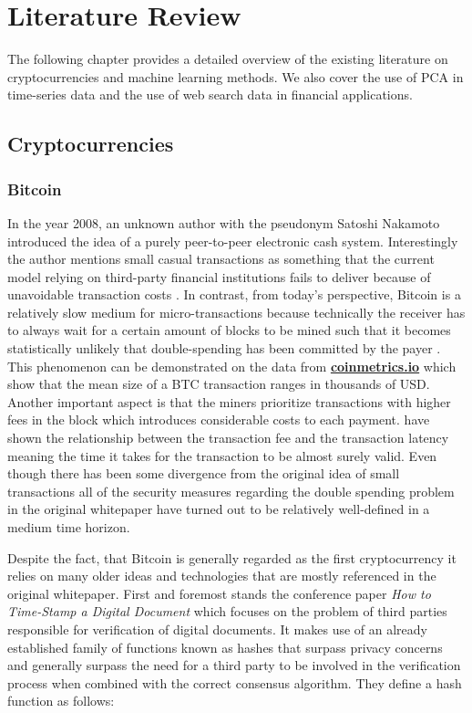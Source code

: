 \chapter{Literature Review}
\label{chap:two}

The following chapter
provides a detailed overview of the existing literature
on cryptocurrencies and machine learning methods.
We also cover the use of \ac{PCA} in time-series data
and the use of web search data in financial applications.
\section{Cryptocurrencies}
\label{sec:crypto}

\subsection{Bitcoin}
In the year 2008, an unknown author with the pseudonym Satoshi Nakamoto introduced the idea of 
a purely peer-to-peer electronic cash system. Interestingly the author mentions 
small casual transactions as something that the current model relying on third-party
financial institutions fails to deliver because of unavoidable transaction costs \citep{Nakamoto2008}. 
In contrast, from today's perspective, Bitcoin is a relatively slow medium for micro-transactions because 
technically the receiver has to always wait for a certain amount of blocks to be mined such that
it becomes statistically unlikely that double-spending has been committed by the payer 
\citep{Conti2018}. This phenomenon
can be demonstrated on the data from \textbf{\href{https://coinmetrics.io/}{coinmetrics.io}} which show
that the mean size of a \ac{BTC} transaction ranges in thousands of USD. 
Another important aspect is that 
the miners prioritize transactions with higher fees in the block which introduces considerable costs
to each payment. \cite{Moeser2015} have shown the relationship between the transaction fee 
and the transaction latency meaning the time it takes for the transaction to be almost surely valid.
Even though 
there has been some divergence from the original idea of small transactions all of the security measures
regarding the double spending problem in the original whitepaper have turned out to be relatively 
well-defined in a medium time horizon.


Despite the fact, that Bitcoin is generally regarded as the first cryptocurrency it relies on 
many older ideas and technologies that are mostly referenced in the original whitepaper. First and foremost
stands the conference paper \textit{How to Time-Stamp a Digital Document} \citep{Haber1991} which focuses
on the problem of third parties responsible for verification of digital documents. It makes use of 
an already established family of functions known as hashes that surpass privacy concerns and generally
surpass the need for a third party to be involved in the verification process when combined
with the correct consensus algorithm. They define a hash function as follows:

